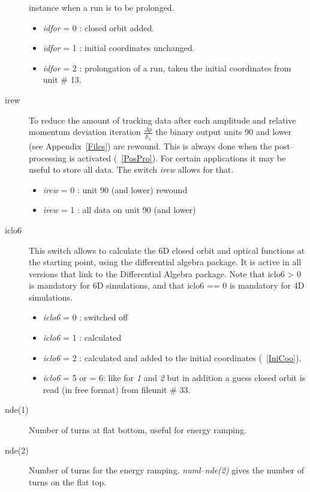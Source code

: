 \begin{description}
  instance when a run is to be prolonged.
 \begin{itemize}
 \item {\em idfor} \/= 0 : closed orbit added.
 \item {\em idfor} \/= 1 : initial coordinates unchanged.
 \item {\em idfor} \/= 2 : prolongation of a run, taken the initial coordinates from unit \# 13.
 \end{itemize}
\item [irew] To reduce the amount of tracking data after each
  amplitude and relative momentum deviation iteration \mbox{$
    \frac{\Delta p}{p_o} $} the binary output units 90 and lower (see
  Appendix~\ref{Files}) are rewound.  This is always done when the
  post--processing is activated (~\ref{PosPro}). For certain
  applications it may be useful to store all data. The switch {\em
    irew} \/allows for that.
 \begin{itemize}
 \item {\em irew} \/= 0 : unit 90 (and lower) rewound
 \item {\em irew} \/= 1 : all data on unit 90 (and lower)
 \end{itemize}
\item [iclo6]
  This switch allows to calculate the 6D closed orbit and optical functions at the starting point, using the differential algebra package.
  It is active in all versions that link to the Differential Algebra package.
  Note that iclo6 > 0 is mandatory for 6D simulations, and that iclo6 == 0 is mandatory for 4D simulations.
 \begin{itemize}
 \item {\em iclo6} \/= 0 : switched off
 \item {\em iclo6} \/= 1 : calculated
 \item {\em iclo6} \/= 2 : calculated and added to the initial coordinates (~\ref{IniCoo}).
 \item {\em iclo6} \/= 5 or = 6: like for {\em 1} \/and {\em 2} \/ but in addition a guess closed orbit is read (in free format) from fileunit \# 33.
 \end{itemize}
\item [nde(1)]
  Number of turns at flat bottom, useful for energy ramping.
\item [nde(2)]
  Number of turns for the energy ramping.  {\em numl}\/--{\em nde(2)} \/ gives the number of turns on the flat top.

\end{description}
